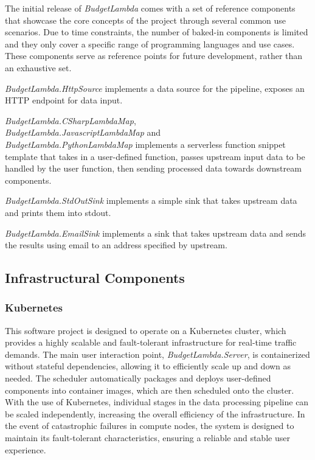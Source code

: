 \documentclass[fleqn,10pt]{SelfArx} %
\begin{document}
The initial release of \emph{BudgetLambda} comes with a set of reference components that showcase the core concepts of the project through several common use scenarios. Due to time constraints, the number of baked-in components is limited and they only cover a specific range of programming languages and use cases. These components serve as reference points for future development, rather than an exhaustive set.

\emph{BudgetLambda.HttpSource} implements a data source for the pipeline, exposes an HTTP endpoint for data input.

\emph{BudgetLambda.CSharpLambdaMap}, \\ \emph{BudgetLambda.JavascriptLambdaMap} and \\ \emph{BudgetLambda.PythonLambdaMap} implements a serverless function snippet template that takes in a user-defined function, passes upstream input data to be handled by the user function, then sending processed data towards downstream components.

\emph{BudgetLambda.StdOutSink} implements a simple sink that takes upstream data and prints them into stdout.

\emph{BudgetLambda.EmailSink} implements a sink that takes upstream data and sends the results using email to an address specified by upstream.

\subsection{Infrastructural Components}

\subsubsection{Kubernetes}

This software project is designed to operate on a Kubernetes cluster, which provides a highly scalable and fault-tolerant infrastructure for real-time traffic demands. The main user interaction point, \emph{BudgetLambda.Server}, is containerized without stateful dependencies, allowing it to efficiently scale up and down as needed. The scheduler automatically packages and deploys user-defined components into container images, which are then scheduled onto the cluster. With the use of Kubernetes, individual stages in the data processing pipeline can be scaled independently, increasing the overall efficiency of the infrastructure. In the event of catastrophic failures in compute nodes, the system is designed to maintain its fault-tolerant characteristics, ensuring a reliable and stable user experience.
\end{document}
